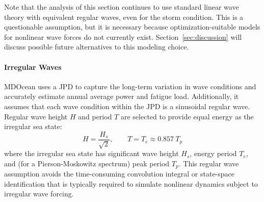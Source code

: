 Note that the analysis of this section continues to use standard linear wave theory with equivalent regular waves, even for the storm condition.
This is a questionable assumption, but it is necessary because optimization-suitable models for nonlinear wave forces do not currently exist.
Section~\ref{sec:discussion} will discuss possible future alternatives to this modeling choice.




\paragraph{Irregular Waves}
MDOcean uses a JPD to capture the long-term variation in wave conditions and accurately estimate annual average power and fatigue load.
Additionally, it assumes that each wave condition within the JPD is a sinusoidal regular wave.
Regular wave height $H$ and period $T$ are selected to provide equal energy as the irregular sea state:
\begin{equation}
    H = \frac{H_s}{\sqrt{2}}, \qquad T = T_e \approx 0.857 ~T_p 
\end{equation}
where the irregular sea state has significant wave height $H_s$, energy period $T_e$, and (for a Pierson-Moskowitz spectrum) peak period $T_p$.
This regular wave assumption avoids the time-consuming convolution integral or state-space identification that is typically required to simulate nonlinear dynamics subject to irregular wave forcing.

